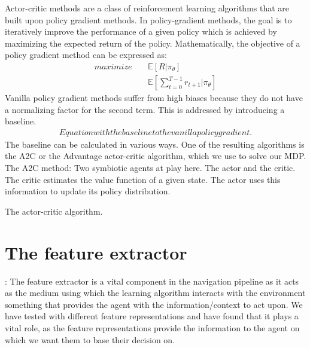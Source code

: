 Actor-critic methods are a class of reinforcement learning algorithms that are built upon policy gradient methods. 
In policy-gradient methods, the goal is to iteratively improve the performance of a given policy which is achieved by maximizing the expected return of the policy. Mathematically, the objective of a policy gradient method can be expressed as:
\begin{align}
maximize \;\;\;\; & \mathbb{E} [ R | \pi_{\theta} ] \\
					   & \mathbb{E}[ \sum^{T-1}_{t=0} r_{t+1}| \pi_{\theta}] 
\end{align}
Vanilla policy gradient methods suffer from high biases because they do not have a normalizing factor for the second term. This is addressed by introducing a 
baseline. 
\begin{align}
Equation with the baseline to the vanilla policy gradient.
\end{align}
The baseline can be calculated in various ways. One of the resulting algorithms is the A2C or the Advantage actor-critic algorithm, which we use to solve our MDP.
The A2C method:
Two symbiotic agents at play here. The actor and the critic. 
The critic estimates the value function of a given state.
The actor uses this information to update its policy distribution.
\begin{algorithm}
	The actor-critic algorithm.
\end{algorithm}


\section*{The feature extractor}:
The feature extractor is a vital component in the navigation pipeline as it acts as the medium using which the learning algorithm interacts with the environment something that provides the agent with the information/context to act upon. 
We have tested with different feature representations and have found that it plays a vital role, as the feature representations provide the information to the agent on which we want them to base their decision on.

